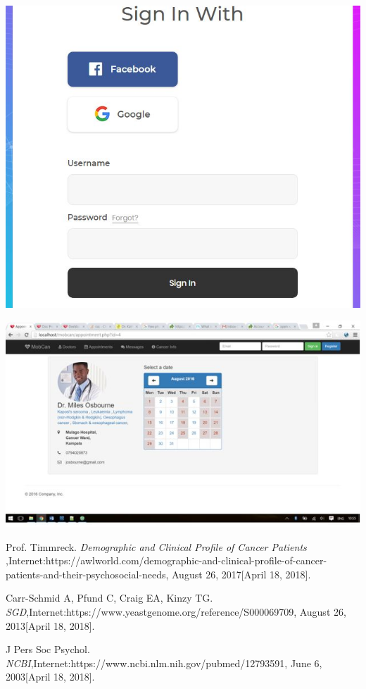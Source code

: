 \documentclass[12pt]{article}
\begin{document}
\begin{center}
\includegraphics[scale=0.6]{loggin}
\end{center}

\begin{center}
\includegraphics[scale=0.8]{appointment}
\end{center}


\begin{thebibliography}{9}

 Prof. Timmreck. \textit{Demographic and Clinical Profile of Cancer Patients },Internet:https://awlworld.com/demographic-and-clinical-profile-of-cancer-patients-and-their-psychosocial-needs, August 26, 2017[April 18, 2018].


Carr-Schmid A, Pfund C, Craig EA, Kinzy TG. \textit{SGD},Internet:https://www.yeastgenome.org/reference/S000069709, August 26, 2013[April 18, 2018].

J Pers Soc Psychol. \textit{NCBI},Internet:https://www.ncbi.nlm.nih.gov/pubmed/12793591, June 6, 2003[April 18, 2018].



\end{thebibliography}
\end{document}
